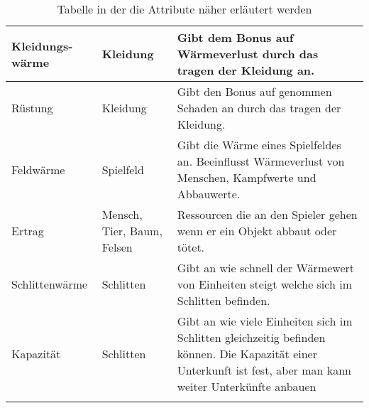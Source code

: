 \documentclass[a4paper,
  twoside, %
  headlines=2.1 %
  ]{scrartcl}
\begin{document}
\begin{center}
\begin{longtable}{ | p{2.5cm} | p{2cm} | p{10cm} | }
				\hline
				Kleidungs-\linebreak wärme & Kleidung & Gibt dem Bonus auf Wärmeverlust durch das tragen der Kleidung an. \\
				\hline
				Rüstung & Kleidung & Gibt den Bonus auf genommen Schaden an durch das tragen der Kleidung. \\
				\hline
				Feldwärme & Spielfeld & Gibt die Wärme eines Spielfeldes an. Beeinflusst Wärmeverlust von Menschen, Kampfwerte und Abbauwerte. \\
				\hline
				Ertrag & Mensch, Tier, Baum, Felsen & Ressourcen die an den Spieler gehen wenn er ein Objekt abbaut oder tötet. \\
				\hline
				Schlittenwärme & Schlitten & Gibt an wie schnell der Wärmewert von Einheiten steigt welche sich im Schlitten befinden. \\
				\hline
				Kapazität & Schlitten & Gibt an wie viele Einheiten sich im Schlitten gleichzeitig befinden können. Die Kapazität einer Unterkunft ist fest, aber man kann weiter Unterkünfte 
anbauen\\
				\hline
				\caption{Tabelle in der die Attribute näher erläutert werden}
			    \label{tab:tabelle}
			    \end{longtable}
			
			\end{center}
		
    \newpage
\end{document}
